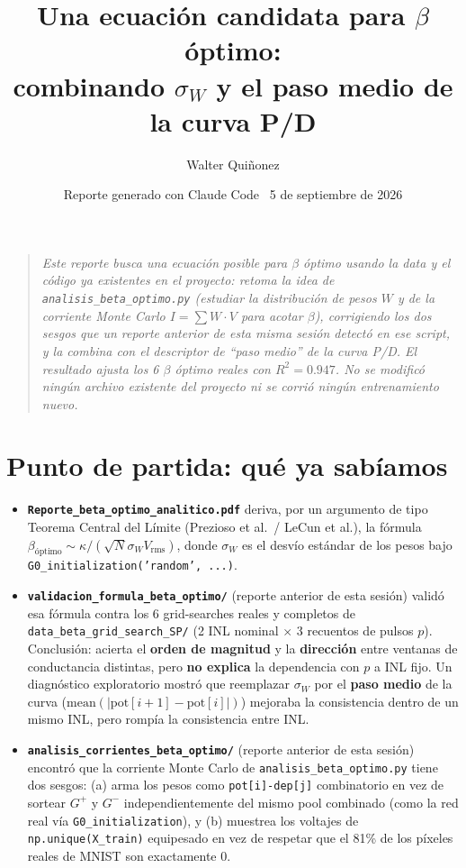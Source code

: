 \documentclass[11pt]{article}
\title{\textbf{Una ecuación candidata para $\beta$ óptimo:\\
combinando $\sigma_W$ y el paso medio de la curva P/D}}
\author{Walter Quiñonez}
\date{Reporte generado con Claude Code \textperiodcentered\ 5 de septiembre de 2026}
\begin{document}
\maketitle

\begin{quote}\itshape
Este reporte busca una ecuación posible para $\beta$ óptimo usando la data
y el código ya existentes en el proyecto: retoma la idea de
\texttt{analisis\_beta\_optimo.py} (estudiar la distribución de pesos $W$ y
de la corriente Monte Carlo $I=\sum W{\cdot}V$ para acotar $\beta$),
corrigiendo los dos sesgos que un reporte anterior de esta misma sesión
detectó en ese script, y la combina con el descriptor de ``paso medio'' de
la curva P/D. El resultado ajusta los 6 $\beta$ óptimo reales con
$R^2=0.947$. No se modificó ningún archivo existente del proyecto ni se
corrió ningún entrenamiento nuevo.
\end{quote}

\tableofcontents

\section{Punto de partida: qué ya sabíamos}

\begin{itemize}
\item \textbf{\texttt{Reporte\_beta\_optimo\_analitico.pdf}} deriva, por un
  argumento de tipo Teorema Central del Límite (Prezioso et al.\ / LeCun
  et al.), la fórmula $\beta_{\text{óptimo}}\sim\kappa/(\sqrt{N}\sigma_W V_{\mathrm{rms}})$,
  donde $\sigma_W$ es el desvío estándar de los pesos bajo
  \texttt{G0\_initialization('random', ...)}.
\item \textbf{\texttt{validacion\_formula\_beta\_optimo/}} (reporte
  anterior de esta sesión) validó esa fórmula contra los 6 grid-searches
  reales y completos de \texttt{data\_beta\_grid\_search\_SP/} (2 INL
  nominal $\times$ 3 recuentos de pulsos $p$). Conclusión: acierta el
  \textbf{orden de magnitud} y la \textbf{dirección} entre ventanas de
  conductancia distintas, pero \textbf{no explica} la dependencia con $p$
  a INL fijo. Un diagnóstico exploratorio mostró que reemplazar $\sigma_W$
  por el \textbf{paso medio} de la curva
  ($\mathrm{mean}(|\mathrm{pot}[i{+}1]-\mathrm{pot}[i]|)$) mejoraba la
  consistencia dentro de un mismo INL, pero rompía la consistencia entre
  INL.
\item \textbf{\texttt{analisis\_corrientes\_beta\_optimo/}} (reporte
  anterior de esta sesión) encontró que la corriente Monte Carlo de
  \texttt{analisis\_beta\_optimo.py} tiene dos sesgos: (a) arma los pesos
  como \texttt{pot[i]-dep[j]} combinatorio en vez de sortear $G^+$ y $G^-$
  independientemente del mismo pool combinado (como la red real vía
  \texttt{G0\_initialization}), y (b) muestrea los voltajes de
  \texttt{np.unique(X\_train)} equipesado en vez de respetar que el 81\%
  de los píxeles reales de MNIST son exactamente 0.
\end{itemize}
\end{document}
